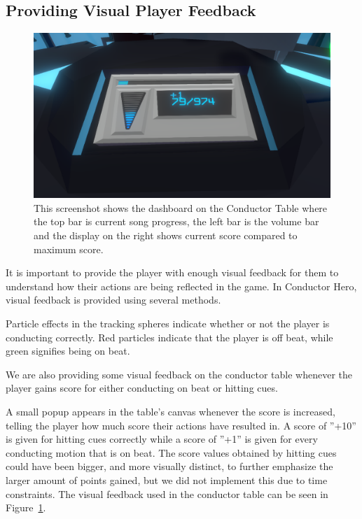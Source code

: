 \subsection{Providing Visual Player Feedback}
\begin{figure}[tbph]
    \centering
    \includegraphics[width=1.0\textwidth]{images/scorePopup}
    \caption[Screenshot of the Conductor Table Dashboard]{This screenshot shows the dashboard on the Conductor Table where the top bar is current song progress, the left bar is the volume bar and the display on the right shows current score compared to maximum score.}
    \label{fig:table}
\end{figure}

It is important to provide the player with enough visual feedback for them to understand how their actions are being reflected in the game. In Conductor Hero, visual feedback is provided using several methods. 

Particle effects in the tracking spheres indicate whether or not the player is conducting correctly. Red particles indicate that the player is off beat, while green signifies being on beat.

We are also providing some visual feedback on the conductor table whenever the player gains score for either conducting on beat or hitting cues. 

A small popup appears in the table’s canvas whenever the score is increased, telling the player how much score their actions have resulted in. A score of ''+10'' is given for hitting cues correctly while a score of ''+1'' is given for every conducting motion that is on beat. The score values obtained by hitting cues could have been bigger, and more visually distinct, to further emphasize the larger amount of points gained, but we did not implement this due to time constraints. The visual feedback used in the conductor table can be seen in Figure~\ref{fig:table}.


